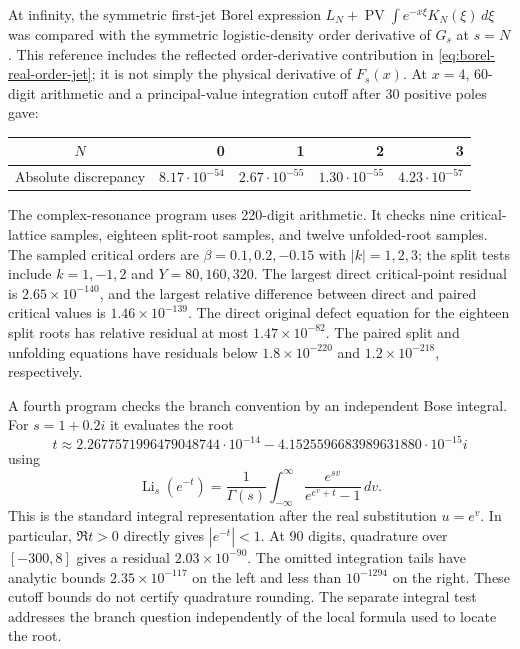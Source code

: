 \documentclass[11pt,a4paper]{article}
\numberwithin{equation}{section}
\theoremstyle{definition}
\theoremstyle{remark}
\DeclareMathOperator{\Li}{Li}
\DeclareMathOperator{\PV}{PV}
\begin{document}
At infinity, the symmetric first-jet Borel expression
$L_N+\PV\int e^{-x\xi}K_N(\xi)\,d\xi$ was compared with the
symmetric logistic-density order derivative of $G_s$ at $s=N$.
This reference includes the reflected order-derivative contribution
in \eqref{eq:borel-real-order-jet}; it is not simply the physical
derivative of $F_s(x)$. At $x=4$, 60-digit arithmetic and a
principal-value integration cutoff after 30 positive poles gave:
\begin{center}
\begin{tabular}{@{}crrrr@{}}
\toprule
$N$ & 0 & 1 & 2 & 3\\
\midrule
Absolute discrepancy &
$8.17\cdot10^{-54}$ & $2.67\cdot10^{-55}$ &
$1.30\cdot10^{-55}$ & $4.23\cdot10^{-57}$\\
\bottomrule
\end{tabular}
\end{center}

The complex-resonance program uses 220-digit arithmetic. It checks
nine critical-lattice samples, eighteen split-root samples, and
twelve unfolded-root samples. The sampled critical orders are
$\beta=0.1,0.2,-0.15$ with $|k|=1,2,3$; the split tests include
$k=1,-1,2$ and $Y=80,160,320$. The largest direct critical-point
residual is $2.65\times10^{-140}$, and the largest relative
difference between direct and paired critical values is
$1.46\times10^{-139}$. The direct original defect equation for the
eighteen split roots has relative residual at most
$1.47\times10^{-82}$. The paired split and unfolding equations have
residuals below $1.8\times10^{-220}$ and $1.2\times10^{-218}$,
respectively.

A fourth program checks the branch convention by an independent
Bose integral. For $s=1+0.2i$ it evaluates the root
\[
 t\approx 2.2677571996479048744\cdot10^{-14}
       -4.1525596683989631880\cdot10^{-15}i
\]
using
\[
 \Li_s(e^{-t})=\frac1{\Gamma(s)}
  \int_{-\infty}^{\infty}
       \frac{e^{sv}}{e^{e^v+t}-1}\,dv.
\]
This is the standard integral representation after the real
substitution $u=e^v$. In particular, $\Re t>0$ directly gives
$|e^{-t}|<1$. At 90 digits, quadrature over $[-300,8]$ gives a
residual $2.03\times10^{-90}$. The omitted integration tails have
analytic bounds $2.35\times10^{-117}$ on the left and less than
$10^{-1294}$ on the right. These cutoff bounds do not certify
quadrature rounding. The separate integral test addresses the
branch question independently of the local formula used to locate
the root.
\end{document}
